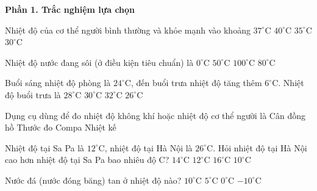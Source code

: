 \textbf{Phần 1. Trắc nghiệm lựa chọn}

\begin{ex} %
Nhiệt độ của cơ thể người bình thường và khỏe mạnh vào khoảng
\choice
{\True $37^\circ\text{C}$}
{$40^\circ\text{C}$}
{$35^\circ\text{C}$}
{$30^\circ\text{C}$}
\end{ex}

\begin{ex} %
Nhiệt độ nước đang sôi (ở điều kiện tiêu chuẩn) là
\choice
{$0^\circ\text{C}$}
{$50^\circ\text{C}$}
{\True $100^\circ\text{C}$}
{$80^\circ\text{C}$}
\end{ex}

\begin{ex} %
Buổi sáng nhiệt độ phòng là $24^\circ\text{C}$, đến buổi trưa nhiệt độ tăng thêm $6^\circ\text{C}$. Nhiệt độ buổi trưa là
\choice
{$28^\circ\text{C}$}
{\True $30^\circ\text{C}$}
{$32^\circ\text{C}$}
{$26^\circ\text{C}$}
\end{ex}

\begin{ex} %
Dụng cụ dùng để đo nhiệt độ không khí hoặc nhiệt độ cơ thể người là
\choice
{Cân đồng hồ}
{Thước đo}
{Compa}
{\True Nhiệt kế}
\end{ex}

\begin{ex} %
Nhiệt độ tại Sa Pa là $12^\circ\text{C}$, nhiệt độ tại Hà Nội là $26^\circ\text{C}$. Hỏi nhiệt độ tại Hà Nội cao hơn nhiệt độ tại Sa Pa bao nhiêu độ C?
\choice
{\True $14^\circ\text{C}$}
{$12^\circ\text{C}$}
{$16^\circ\text{C}$}
{$10^\circ\text{C}$}
\end{ex}

\begin{ex} %
Nước đá (nước đóng băng) tan ở nhiệt độ nào?
\choice
{$10^\circ\text{C}$}
{$5^\circ\text{C}$}
{\True $0^\circ\text{C}$}
{$-10^\circ\text{C}$}
\end{ex}

